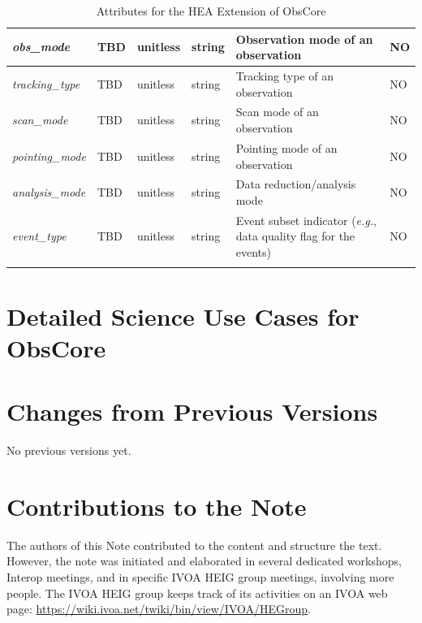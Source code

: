 \documentclass[11pt,a4paper]{ivoa}
\begin{document}
\begin{landscape}
\begin{center}
\begin{longtable}{ | p{0.125\linewidth} | p{0.075\linewidth} | p{0.075\linewidth} | p{0.075\linewidth} | p{0.6\linewidth} | p{0.05\linewidth} |}
\hline
{\em obs\_mode\/} & TBD & unitless & string &  Observation mode of an observation & NO \\
\hline
{\em tracking\_type\/} & TBD & unitless & string & Tracking type of an observation & NO \\
\hline
{\em scan\_mode\/} & TBD & unitless & string & Scan mode of an observation & NO \\
\hline
{\em pointing\_mode\/} & TBD & unitless & string & Pointing mode of an observation & NO \\
\hline
{\em analysis\_mode\/} & TBD & unitless & string & Data reduction/analysis mode & NO \\
\hline
{\em event\_type\/} & TBD & unitless & string & Event subset indicator ({\em e.g.\/}, data quality flag for the events) & NO \\
\hline
\caption{Attributes for the \gls{HEA} Extension of ObsCore}
\label{tab:hea_ext_attr}
\end{longtable}
\end{center}
\end{landscape}


\pagebreak



\appendix


\section{Detailed Science Use Cases for ObsCore}
\label{sec:uc}




\section{Changes from Previous Versions}

No previous versions yet.


\section{Contributions to the Note}

The authors of this Note contributed to the content and structure the text. However, the note was initiated and elaborated in several dedicated workshops, Interop meetings, and in specific \gls{IVOA} \gls{HEIG} group meetings, involving more people. The \gls{IVOA} \gls{HEIG} group keeps track of its activities on an \gls{IVOA} web page: \url{https://wiki.ivoa.net/twiki/bin/view/IVOA/HEGroup}.
\end{document}
